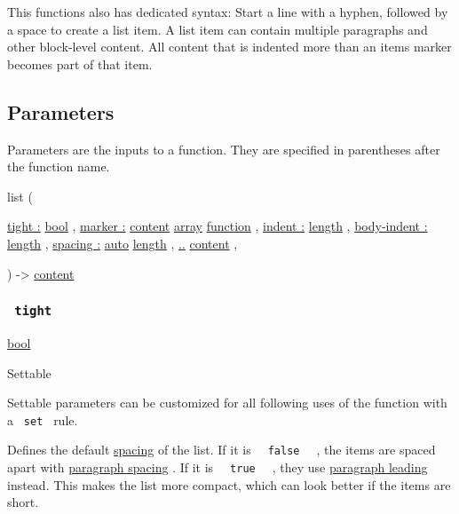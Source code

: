 This functions also has dedicated syntax: Start a line with a hyphen,
followed by a space to create a list item. A list item can contain
multiple paragraphs and other block-level content. All content that is
indented more than an item\textquotesingle s marker becomes part of that
item.

\subsection{\texorpdfstring{{ Parameters
}}{ Parameters }}\label{parameters}

\label{parameters-tooltip}
Parameters are the inputs to a function. They are specified in
parentheses after the function name.

{ list } (

{ \hyperref[parameters-tight]{tight :}
\href{/docs/reference/foundations/bool/}{bool} , } {
\hyperref[parameters-marker]{marker :}
\href{/docs/reference/foundations/content/}{content}
\href{/docs/reference/foundations/array/}{array}
\href{/docs/reference/foundations/function/}{function} , } {
\hyperref[parameters-indent]{indent :}
\href{/docs/reference/layout/length/}{length} , } {
\hyperref[parameters-body-indent]{body-indent :}
\href{/docs/reference/layout/length/}{length} , } {
\hyperref[parameters-spacing]{spacing :}
\href{/docs/reference/foundations/auto/}{auto}
\href{/docs/reference/layout/length/}{length} , } {
\hyperref[parameters-children]{..}
\href{/docs/reference/foundations/content/}{content} , }

) -\textgreater{} \href{/docs/reference/foundations/content/}{content}

\subsubsection{\texorpdfstring{\texttt{\ tight\ }}{ tight }}\label{parameters-tight}

\href{/docs/reference/foundations/bool/}{bool}

{{ Settable }}

\label{parameters-tight-settable-tooltip}
Settable parameters can be customized for all following uses of the
function with a \texttt{\ set\ } rule.

Defines the default
\href{/docs/reference/model/list/\#parameters-spacing}{spacing} of the
list. If it is \texttt{\ }{\texttt{\ false\ }}\texttt{\ } , the items
are spaced apart with
\href{/docs/reference/model/par/\#parameters-spacing}{paragraph spacing}
. If it is \texttt{\ }{\texttt{\ true\ }}\texttt{\ } , they use
\href{/docs/reference/model/par/\#parameters-leading}{paragraph leading}
instead. This makes the list more compact, which can look better if the
items are short.

